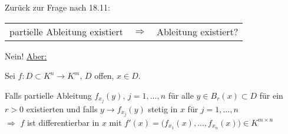 Zurück zur Frage nach 18.11: \\ \begin{tabularx}{\linewidth}{XcX}
	\hfill partielle Ableitung existiert & $\Rightarrow$ & Ableitung existiert?
\end{tabularx}
Nein! \uline{Aber:}

\begin{theorem}
	Sei $f:D\subset K^n\to K^m$, $D$ offen, $x\in D$.
	
	Falls partielle Ableitung $f_{x_j}(y)$, $j=1,\dotsc,n$ für alle $y\in B_r(x)\subset D$ für ein $r > 0$ existierten und falls $y\to f_{x_j}(y)$ stetig in $x$ für $j=1,\dotsc,n$ \\
	$\Rightarrow$ $f$ ist differentierbar in $x$ mit $f'(x) = \big( f_{x_1}(x), \dotsc, f_{x_n}(x) \big) \in K^{m\times n}$
\end{theorem}

